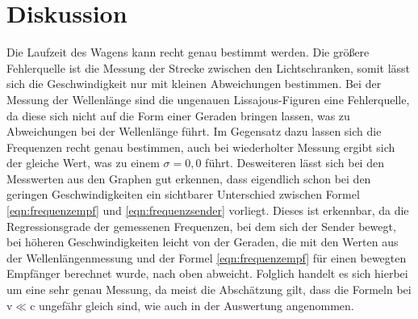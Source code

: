 \newpage
\section{Diskussion}
\label{sec:Diskussion}
Die Laufzeit des Wagens kann recht genau bestimmt werden. Die größere Fehlerquelle
ist die Messung der Strecke zwischen den Lichtschranken, somit lässt sich die Geschwindigkeit
nur mit kleinen Abweichungen bestimmen.
Bei der Messung der Wellenlänge sind die ungenauen Lissajous-Figuren eine Fehlerquelle,
da diese sich nicht auf die Form einer Geraden bringen lassen, was zu Abweichungen bei der Wellenlänge
führt. Im Gegensatz dazu lassen sich die Frequenzen recht genau bestimmen, auch bei wiederholter
Messung ergibt sich der gleiche Wert, was zu einem $\sigma=0,0$ führt.
Desweiteren lässt sich bei den Messwerten aus den Graphen gut erkennen, dass eigendlich schon bei den geringen
Geschwindigkeiten ein sichtbarer Unterschied zwischen Formel \ref{eqn:frequenzempf} und \ref{eqn:frequenzsender} vorliegt.
Dieses ist erkennbar, da die Regressionsgrade der gemessenen Frequenzen, bei dem sich der Sender bewegt,
bei höheren Geschwindigkeiten leicht von der Geraden, die mit den Werten
aus der Wellenlängenmessung und der Formel \ref{eqn:frequenzempf} für einen bewegten Empfänger berechnet wurde, nach oben abweicht.
Folglich handelt es sich hierbei um eine sehr genau Messung, da meist die Abschätzung gilt, dass die Formeln bei v$\ll$c ungefähr gleich
sind, wie auch in der Auswertung angenommen.
